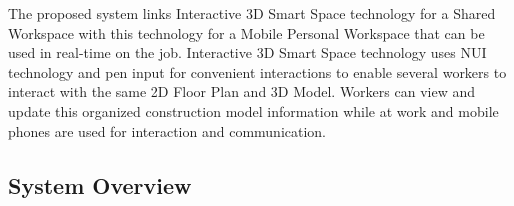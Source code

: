 The proposed system links Interactive 3D Smart Space technology for a Shared Workspace with this technology for a Mobile Personal Workspace that can be used in real-time on the job. Interactive 3D Smart Space technology uses NUI technology and pen input for convenient interactions to enable several workers to interact with the same 2D Floor Plan and 3D Model. Workers can view and update this organized construction model information while at work and mobile phones are used for interaction and communication. 

\subsection{System Overview}
